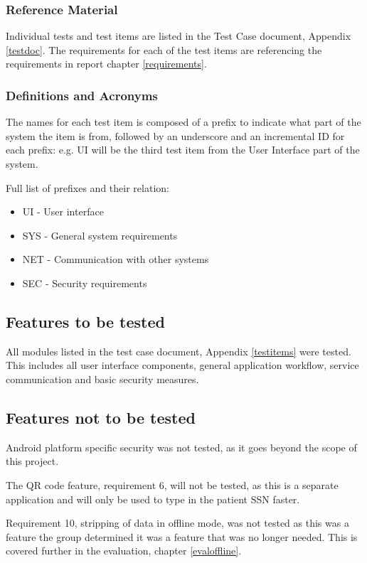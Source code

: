 \subsubsection{Reference Material}
Individual tests and test items are listed in the Test Case document, Appendix \ref{testdoc}. The requirements for each of the test items are referencing the requirements in report chapter \ref{requirements}.

\subsubsection{Definitions and Acronyms}
The names for each test item is composed of a prefix to indicate what part of the system the item is from, followed by an underscore and an incremental ID for each prefix: e.g. UI will be the third test item from the User Interface part of the system.

Full list of prefixes and their relation:
\begin{itemize}
\item UI  	   	- User interface
\item SYS  		- General system requirements
\item NET 		- Communication with other systems
\item SEC 		- Security requirements

\end{itemize}

\subsection{Features to be tested}
All modules listed in the test case document, Appendix \ref{testitems} were tested. This includes all user interface components, general application workflow, service communication and basic security measures.

\subsection{Features not to be tested}
Android platform specific security was not tested, as it goes beyond the scope of this project. 

The QR code feature, requirement 6, will not be tested, as this is a separate application and will only be used to type in the patient SSN faster.

Requirement 10, stripping of data in offline mode, was not tested as this was a feature the group determined it was a feature that was no longer needed. This is covered further in the evaluation, chapter \ref{evaloffline}.

